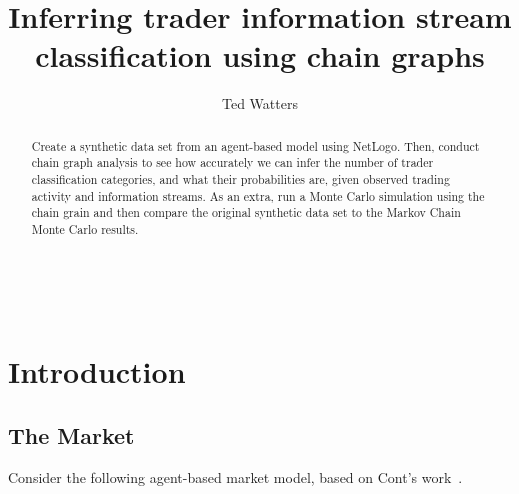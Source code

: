 \documentclass[a4paper, 11pt]{report}
\title{Inferring trader information stream classification using chain graphs}
\author{Ted Watters}
\let\Oldsection\section
\renewcommand{\section}{\FloatBarrier\Oldsection}
\begin{document}
\maketitle


\begin{abstract}
	Create a synthetic data set from an agent-based model using NetLogo. Then, conduct chain graph analysis to see how accurately we can infer the number of trader classification categories, and what their probabilities are, given observed trading activity and information streams. As an extra, run a Monte Carlo simulation using the chain grain and then compare the original synthetic data set to the Markov Chain Monte Carlo results.
\end{abstract}\
\tableofcontents
\chapter{Introduction}
\section{The Market}
Consider the following agent-based market model, based on Cont's work~\cite{ghoulmie_cont_nadal_2005}. 
\end{document}
